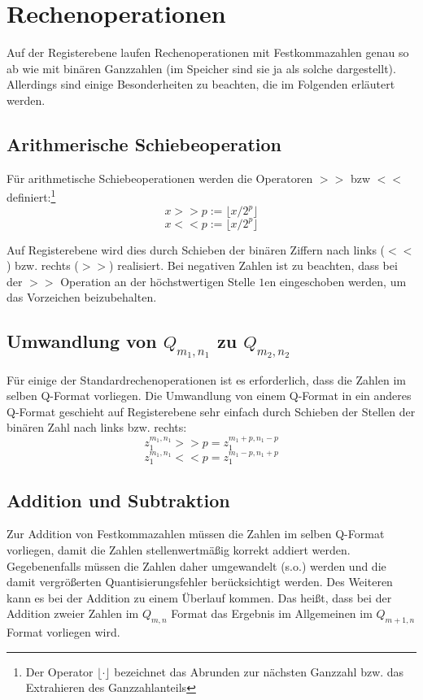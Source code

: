 
\section{Rechenoperationen}
Auf der Registerebene laufen Rechenoperationen mit Festkommazahlen genau so ab wie mit binären Ganzzahlen (im Speicher sind sie ja als solche dargestellt). Allerdings sind einige Besonderheiten zu beachten, die im Folgenden erläutert werden.

\subsection{Arithmerische Schiebeoperation}
Für arithmetische Schiebeoperationen werden die Operatoren $>>$ bzw $<<$ definiert:\footnote{Der Operator $\lfloor \cdot \rfloor$ bezeichnet das Abrunden zur nächsten Ganzzahl bzw. das Extrahieren des Ganzzahlanteils}
\[x >> p := \lfloor x/2^p \rfloor\]
\[x << p := \lfloor x/2^p \rfloor\]

Auf Registerebene wird dies durch Schieben der binären Ziffern nach links ($<<$) bzw. rechts ($>>$) realisiert. Bei negativen Zahlen ist zu beachten, dass bei der $>>$ Operation an der höchstwertigen Stelle $1$en eingeschoben werden, um das Vorzeichen beizubehalten.

\subsection{Umwandlung von \texorpdfstring{$Q_{m_1,n_1}$ zu  $Q_{m_2,n_2}$}{Qm1.n1 zu Qm2.n2}}
Für einige der Standardrechenoperationen ist es erforderlich, dass die Zahlen im selben Q-Format vorliegen. Die Umwandlung von einem Q-Format in ein anderes Q-Format geschieht auf Registerebene sehr einfach durch Schieben der Stellen der binären Zahl nach links bzw. rechts:
\[z_1^{m_1,n_1} >> p = z_1^{m_1+p,n_1-p}\]
\[z_1^{m_1,n_1} << p = z_1^{m_1-p,n_1+p}\]

\subsection{Addition und Subtraktion}
Zur Addition von Festkommazahlen müssen die Zahlen im selben Q-Format vorliegen, damit die Zahlen stellenwertmäßig korrekt addiert werden. Gegebenenfalls müssen die Zahlen daher umgewandelt (s.o.) werden und die damit vergrößerten Quantisierungsfehler berücksichtigt werden. Des Weiteren kann es bei der Addition zu einem Überlauf kommen. Das heißt, dass bei der Addition zweier Zahlen im $Q_{m,n}$ Format das Ergebnis im Allgemeinen im $Q_{m+1,n}$ Format vorliegen wird.

